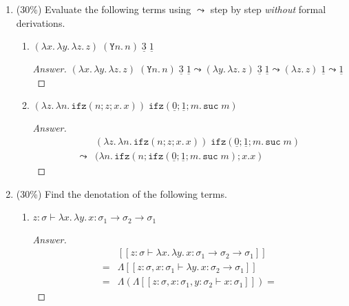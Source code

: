\documentclass{article}
\newcommand{\sem}[1]{[\![#1]\!]}
\begin{document}
\begin{enumerate}
\begin{enumerate}
\begin{proof}
        \end{proof}
    \end{enumerate}
  \item (30\%) Evaluate the following terms using $\leadsto$ step by step
    \emph{without} formal derivations.
    \begin{enumerate}
      \item $(\lambda x.\, \lambda y.\, \lambda z.\, z) \;(\mathtt{Y} n.\,
        n)\;\underline{3}\;\underline{1}$
        \begin{proof}[Answer]
          $(\lambda x.\, \lambda y.\, \lambda z.\, z)
          \;(\mathtt{Y} n.\, n)\;\underline{3}\;\underline{1}
          \leadsto (\lambda y.\,\lambda z.\, z)\;\underline{3}\;\underline{1}
          \leadsto (\lambda z.\, z)\;\underline{1}
          \leadsto \underline{1}$
        \end{proof}
      \item $\left(\lambda z.\,\lambda n.\,\mathtt{ifz}(n; z; x.\,x)\right)\;
        \mathtt{ifz}(\underline{0}; \underline{1}; m.\, \mathtt{suc}\;m)$
        \begin{proof}[Answer]
          \begin{align*}
            & \left(\lambda z.\,\lambda n.\,\mathtt{ifz}(n; z; x.\,x)\right)\;
            \mathtt{ifz}(\underline{0}; \underline{1}; m.\, \mathtt{suc}\;m) \\
            \leadsto&(\lambda n.\, \mathtt{ifz}(n; \mathtt{ifz}(\underline{0};
            \underline{1}; m.\, \mathtt{suc}\;m);
            x. x)
          \end{align*}
        \end{proof}
    \end{enumerate}
  \item (30\%) Find the denotation of the following terms.
    \begin{enumerate}
      \item $z : \sigma \vdash \lambda x.\,\lambda y.\, x : \sigma_1 \to
        \sigma_2 \to \sigma_1$
        \begin{proof}[Answer]
          \begin{align*}
            &\sem{z : \sigma \vdash \lambda x.\,\lambda y.\, x : \sigma_1 \to
              \sigma_2 \to \sigma_1} \\
            ={} & \Lambda \sem{z : \sigma, x : \sigma_1
              \vdash \lambda y.\, x : \sigma_2\to\sigma_1} \\
            ={} & \Lambda (\Lambda
            \sem{z : \sigma, x : \sigma_1, y : \sigma_2 \vdash x : \sigma_1}) =

\end{align*}
\end{proof}
\end{enumerate}
\end{enumerate}
\end{document}
